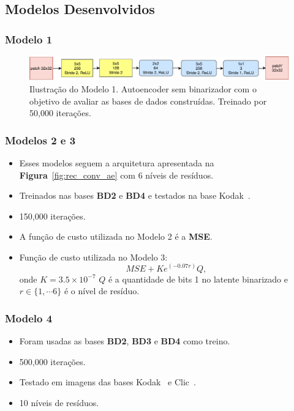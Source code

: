 \documentclass{beamer}
\begin{document}
\subsection{Modelos Desenvolvidos}
\begin{frame}
\frametitle{Modelo 1}
\begin{figure}
\includegraphics[width=\textwidth]{figs/conv_ae.pdf}
\caption{Ilustração do Modelo 1. Autoencoder sem binarizador com o objetivo de avaliar as bases de dados construídas. Treinado por 50,000 iterações.}
\end{figure}
\end{frame}

\begin{frame}
\frametitle{Modelos 2 e 3}
\begin{itemize}
    \item Esses modelos seguem a arquitetura apresentada na \textbf{Figura}~\ref{fig:rec_conv_ae} com 6 níveis de resíduos. 
    \item Treinados nas bases \textbf{BD2} e \textbf{BD4} e testados na base Kodak~\cite{kodak}. 
    \item 150,000 iterações.
    \item A função de custo utilizada no Modelo 2 é a \textbf{MSE}. 
    \item Função de custo utilizada no Modelo 3: $$MSE + Ke^{(-0.07r)}Q,$$
    onde $K = 3.5 \times 10^{-7}$ $Q$ é a quantidade de bits 1 no latente binarizado e $r \in \{1, \cdots 6\}$ é o nível de resíduo. 
\end{itemize}
\end{frame}

\begin{frame}
\frametitle{Modelo 4}
\begin{itemize}
    \item Foram usadas as bases \textbf{BD2}, \textbf{BD3} e \textbf{BD4} como treino. 
    \item 500,000 iterações.
    \item Testado em imagens das bases Kodak~\cite{kodak} e Clic~\cite{clic}.
    \item 10 níveis de resíduos.
\end{itemize}
\end{frame}
\end{document}
